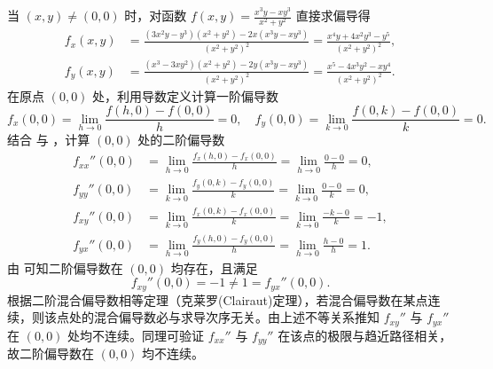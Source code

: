 \begin{myproof}
    当 $(x, y) \neq (0, 0)$ 时，对函数 $f(x, y) = \frac{x^3 y - x y^3}{x^2 + y^2}$ 直接求偏导得
    \begin{equation}
        \label{eq:first-order-partials-1}
        \begin{aligned}
            f_x(x, y) & = \frac{(3x^2 y - y^3)(x^2 + y^2) - 2x(x^3 y - x y^3)}{(x^2 + y^2)^2} = \frac{x^4 y + 4x^2 y^3 - y^5}{(x^2 + y^2)^2}, \\
            f_y(x, y) & = \frac{(x^3 - 3x y^2)(x^2 + y^2) - 2y(x^3 y - x y^3)}{(x^2 + y^2)^2} = \frac{x^5 - 4x^3 y^2 - x y^4}{(x^2 + y^2)^2}.
        \end{aligned}
    \end{equation}
    在原点 $(0, 0)$ 处，利用导数定义计算一阶偏导数
    \begin{equation}
        \label{eq:origin-first-order-2}
        f_x(0, 0) = \lim_{h \to 0} \frac{f(h, 0) - f(0, 0)}{h} = 0, \quad f_y(0, 0) = \lim_{k \to 0} \frac{f(0, k) - f(0, 0)}{k} = 0.
    \end{equation}
    结合  与 ，计算 $(0, 0)$ 处的二阶偏导数
    \begin{equation}
        \label{eq:second-order-at-origin-3}
        \begin{aligned}
            f_{xx}''(0, 0) & = \lim_{h \to 0} \frac{f_x(h, 0) - f_x(0, 0)}{h} = \lim_{h \to 0} \frac{0 - 0}{h} = 0,   \\
            f_{yy}''(0, 0) & = \lim_{k \to 0} \frac{f_y(0, k) - f_y(0, 0)}{k} = \lim_{k \to 0} \frac{0 - 0}{k} = 0,   \\
            f_{xy}''(0, 0) & = \lim_{k \to 0} \frac{f_x(0, k) - f_x(0, 0)}{k} = \lim_{k \to 0} \frac{-k - 0}{k} = -1, \\
            f_{yx}''(0, 0) & = \lim_{h \to 0} \frac{f_y(h, 0) - f_y(0, 0)}{h} = \lim_{h \to 0} \frac{h - 0}{h} = 1.
        \end{aligned}
    \end{equation}
    由  可知二阶偏导数在 $(0, 0)$ 均存在，且满足
    \begin{equation}
        \boxed{f_{xy}''(0, 0) = -1 \neq 1 = f_{yx}''(0, 0)}.
    \end{equation}
    根据二阶混合偏导数相等定理（克莱罗(Clairaut)定理），若混合偏导数在某点连续，则该点处的混合偏导数必与求导次序无关。由上述不等关系推知 $f_{xy}''$ 与 $f_{yx}''$ 在 $(0, 0)$ 处均不连续。同理可验证 $f_{xx}''$ 与 $f_{yy}''$ 在该点的极限与趋近路径相关，故二阶偏导数在 $(0, 0)$ 均不连续。
\end{myproof}



